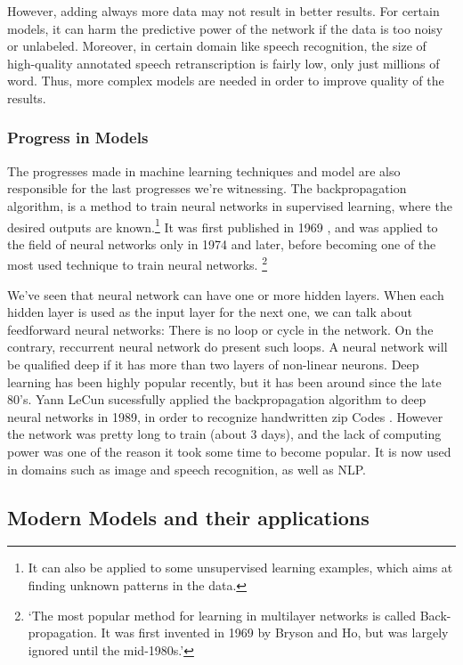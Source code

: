 \documentclass[12pt]{article}
\begin{document}
However, adding always more data may not result in better results. For certain
models, it can harm the predictive power of the network if the data is too noisy
or unlabeled. \cite{trainingData} Moreover, in certain domain like speech
recognition, the size of high-quality annotated speech retranscription is fairly
low, only just millions of word. Thus, more complex models are needed in order
to improve quality of the results.


\subsubsection{Progress in Models}

The progresses made in machine learning techniques and model are also
responsible for the last progresses we're witnessing. The backpropagation
algorithm, is a method to train neural networks in supervised learning, where
the desired outputs are known.\footnote{It can also be applied to some
unsupervised learning examples, which aims at finding unknown patterns in the
data.} It was first published in 1969 \cite{backpropagation}, and was applied to
the field of neural networks only in 1974 and later, before becoming one of the
most used technique to train neural networks. \footnote{\lq The most popular
method for learning in multilayer networks is called Back-propagation. It was
first invented in 1969 by Bryson and Ho, but was largely ignored until the
mid-1980s.\rq  \cite{RusselAI}}

We've seen that neural network can have one or more hidden layers. When each
hidden layer is used as the input layer for the next one, we can talk about
feedforward neural networks: There is no loop or cycle in the network. On the
contrary, reccurrent neural network do present such loops. A neural network
will be qualified deep if it has more than two layers of non-linear neurons.
Deep learning has been highly popular recently, but it has been around since the late
80's. Yann LeCun sucessfully applied the backpropagation algorithm to deep neural
networks in 1989, in order to recognize handwritten zip Codes \cite{lecun}.
However the network was pretty long to train (about 3 days), and the lack of computing
power was one of the reason it took some time to become popular. It is now
used in domains such as image and speech recognition, as well as NLP.



\pagebreak

\subsection{Modern Models and their applications}
\end{document}
